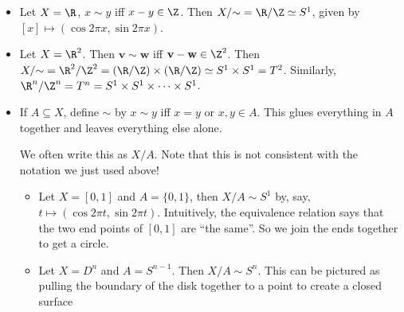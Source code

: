 \documentclass[a4paper]{article}
\begin{document}
\begin{eg}\leavevmode
  \begin{itemize}
    \item Let $X = \R$, $x\sim y$ iff $x - y\in \Z$. Then $X/{\sim} = \R/\Z \simeq S^1$, given by $[x] \mapsto (\cos 2\pi x, \sin 2\pi x)$.
    \item Let $X = \R^2$. Then $\mathbf{v}\sim \mathbf{w}$ iff $\mathbf{v} - \mathbf{w} \in \Z^2$. Then $X/{\sim} = \R^2/\Z^2 = (\R/\Z)\times (\R/\Z) \simeq S^1\times S^1 = T^2$. Similarly, $\R^n/\Z^n = T^n = S^1\times S^1 \times \cdots \times S^1$.
    \item If $A\subseteq X$, define $\sim$ by $x\sim y$ iff $x = y$ or $x, y\in A$. This glues everything in $A$ together and leaves everything else alone.

      We often write this as $X/A$. Note that this is not consistent with the notation we just used above!
      \begin{itemize}
        \item Let $X = [0, 1]$ and $A = \{0, 1\}$, then $X/A \sim S^1$ by, say, $t\mapsto (\cos 2\pi t, \sin 2\pi t)$. Intuitively, the equivalence relation says that the two end points of $[0, 1]$ are ``the same''. So we join the ends together to get a circle.
          \begin{center}
          \end{center}

        \item Let $X = D^n$ and $A = S^{n - 1}$. Then $X/A \sim S^n$. This can be pictured as pulling the boundary of the disk together to a point to create a closed surface
          \begin{center}
\end{center}
\end{itemize}
\end{itemize}
\end{eg}
\end{document}
